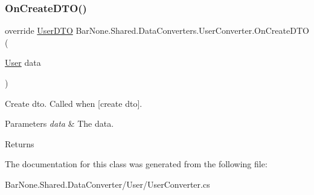 \subsubsection{\texorpdfstring{On\+Create\+D\+T\+O()}{OnCreateDTO()}}
{\footnotesize\ttfamily override \mbox{\hyperlink{class_bar_none_1_1_shared_1_1_data_transfer_1_1_user_d_t_o}{User\+D\+TO}} Bar\+None.\+Shared.\+Data\+Converters.\+User\+Converter.\+On\+Create\+D\+TO (\begin{DoxyParamCaption}\item[{\mbox{\hyperlink{class_bar_none_1_1_shared_1_1_domain_model_1_1_user}{User}}}]{data }\end{DoxyParamCaption})}



Create dto. Called when \mbox{[}create dto\mbox{]}. 


\begin{DoxyParams}{Parameters}
{\em data} & The data.\\
\hline
\end{DoxyParams}
\begin{DoxyReturn}{Returns}

\end{DoxyReturn}


The documentation for this class was generated from the following file\+:\begin{DoxyCompactItemize}
\item 
Bar\+None.\+Shared.\+Data\+Converter/\+User/User\+Converter.\+cs\end{DoxyCompactItemize}
